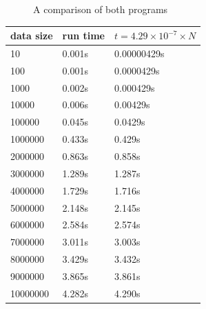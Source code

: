 \documentclass{article}
\begin{document}
 \begin{figure}
   \centering
  
   \caption{A comparison of both programs}
   \label{fig:experiment1}
 \end{figure}


 \begin{center}
 \begin{tabular}{l||l|l|}
   data size   & run time    & $t = 4.29 \times 10^{-7} \times N$ \\  \hline
   10          & 0.001s       & 0.00000429s \\
   100         & 0.001s       & 0.0000429s \\
   1000        & 0.002s       & 0.000429s \\
   10000       & 0.006s       & 0.00429s \\
   100000      & 0.045s       & 0.0429s \\
   1000000     & 0.433s       & 0.429s  \\
   2000000     & 0.863s       & 0.858s \\
   3000000     & 1.289s       & 1.287s \\
   4000000     & 1.729s       & 1.716s \\
   5000000     & 2.148s       & 2.145s \\
   6000000     & 2.584s       & 2.574s \\
   7000000     & 3.011s       & 3.003s \\
   8000000     & 3.429s       & 3.432s \\
   9000000     & 3.865s       & 3.861s \\
   10000000    & 4.282s       & 4.290s \\

 \end{tabular}
 \end{center}
\end{document}
